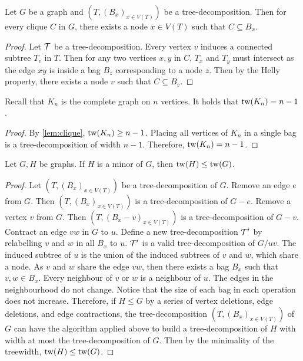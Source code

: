\begin{proposition}\label{lem:clique}
	Let $G$ be a graph and $(T, (B_x)_{x \in V(T)})$ be a tree-decomposition. Then for every clique \(C\) in \(G\), there exists a node \(x \in V(T)\) such that \(C \subseteq B_x\).
\end{proposition}

\begin{proof}
	Let \(\mathcal{T}\) be a tree-decomposition. Every vertex \(v\) induces a connected subtree \(T_v\) in \(T\). Then for any two vertices \(x, y\) in \(C\), \(T_x\) and \(T_y\) must intersect as the edge \(xy\) is inside a bag \(B_z\) corresponding to a node \(z\). Then by the Helly property, there exists a node \(v\) such that \(C \subseteq B_v\).
\end{proof}

\begin{corollary}\label{cor:complete_tw}
	Recall that $K_n$ is the complete graph on $n$ vertices. It holds that \(\operatorname{tw}(K_n) = n-1\).
\end{corollary}
\begin{proof}
	By \cref{lem:clique}, $\operatorname{tw}(K_n)\geq n-1$. Placing all vertices of $K_n$ in a single bag is a tree-decomposition of width $n-1$. Therefore, $\operatorname{tw}(K_n) = n-1$. 
\end{proof}

\begin{proposition}\label{thm:tw_minor_closure}
	Let $G, H$ be graphs. If \(H\) is a minor of \(G\), then \(\operatorname{tw}(H) \leq \operatorname{tw}(G)\).
\end{proposition}
\begin{proof}
	Let \((T, {(B_x)}_{x \in V(T)})\) be a tree-decomposition of \(G\). Remove an edge $e$ from $G$. Then \((T, {(B_x)}_{x \in V(T)})\) is a tree-decomposition of $G - e$. Remove a vertex $v$ from $G$. Then \((T, {(B_x - v)}_{x \in V(T)})\) is a tree-decomposition of $G - v$. Contract an edge $vw$ in $G$ to $u$. Define a new tree-decomposition $\mathcal{T}'$ by relabelling \(v\) and \(w\) in all $B_x$ to \(u\). $\mathcal{T}'$ is a valid tree-decomposition of $G / uv$. The induced subtree of \(u\) is the union of the induced subtrees of \(v\) and \(w\), which share a node. As $v$ and $w$ share the edge $vw$, then there exists a bag $B_x$ such that $v, w \in B_x$. Every neighbour of \(v\) or \(w\) is a neighbour of \(u\). The edges in the neighbourhood do not change. Notice that the size of each bag in each operation does not increase. Therefore, if $H \leq G$ by a series of vertex deletions, edge deletions, and edge contractions, the tree-decomposition \((T, {(B_x)}_{x \in V(T)})\) of $G$ can have the algorithm applied above to build a tree-decomposition of $H$ with width at most the tree-decomposition of $G$. Then by the minimality of the treewidth, \(\operatorname{tw}(H) \leq \operatorname{tw}(G)\). 
\end{proof}

